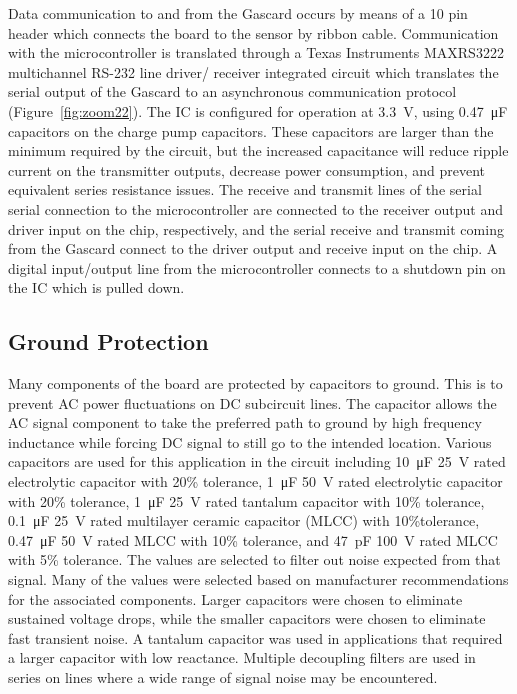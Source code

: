 \documentclass[journal]{IEEEtran}
\begin{document}
Data communication to and from the Gascard occurs by means of a 10 pin header which connects the board to the sensor by ribbon cable.  Communication with the microcontroller is translated through a Texas Instruments MAXRS3222 multichannel RS-232 line driver/ receiver integrated circuit which translates the serial output of the Gascard to an asynchronous communication protocol (Figure~\ref{fig:zoom22}).  The IC is configured for operation at \SI{3.3}{\volt}, using \SI{0.47}{\micro\farad} capacitors on the charge pump capacitors.  These capacitors are larger than the minimum required by the circuit, but the increased capacitance will reduce ripple current on the transmitter outputs, decrease power consumption, and prevent equivalent series resistance issues.  The receive and transmit lines of the serial serial connection to the microcontroller are connected to the receiver output and driver input on the chip, respectively, and the serial receive and transmit coming from the Gascard connect to the driver output and receive input on the chip.  A digital input/output line from the microcontroller connects to a shutdown pin on the IC which is pulled down.

\subsection{Ground Protection}
Many components of the board are protected by capacitors to ground.  This is to prevent AC power fluctuations on DC subcircuit lines.  The capacitor allows the AC signal component to take the preferred path to ground by high frequency inductance while forcing DC signal to still go to the intended location.  Various capacitors are used for this application in the circuit including \SI{10}{\micro\farad} \SI{25}{\volt} rated electrolytic capacitor with 20\% tolerance, \SI{1}{\micro\farad} \SI{50}{\volt} rated electrolytic capacitor with 20\% tolerance, \SI{1}{\micro\farad} \SI{25}{\volt} rated tantalum capacitor with 10\% tolerance, \SI{0.1}{\micro\farad} \SI{25}{\volt} rated multilayer ceramic capacitor (MLCC) with 10\%tolerance, \SI{0.47}{\micro\farad} \SI{50}{\volt} rated MLCC with 10\% tolerance, and \SI{47}{\pico\farad} \SI{100}{\volt} rated MLCC with 5\% tolerance.  The values are selected to filter out noise expected from that signal.  Many of the values were selected based on manufacturer recommendations for the associated components.  Larger capacitors were chosen to eliminate sustained voltage drops, while the smaller capacitors were chosen to eliminate fast transient noise.  A tantalum capacitor was used in applications that required a larger capacitor with low reactance.  Multiple decoupling filters are used in series on lines where a wide range of signal noise may be encountered.
\end{document}

